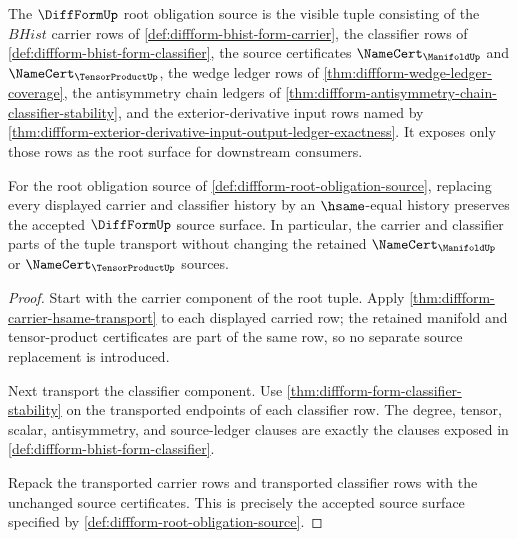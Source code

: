 \begin{definition}
\label{def:diffform-root-obligation-source}
The $\DiffFormUp$ root obligation source is the visible tuple consisting of
the $BHist$ carrier rows of
\autoref{def:diffform-bhist-form-carrier}, the classifier rows of
\autoref{def:diffform-bhist-form-classifier}, the source certificates
$\NameCert_{\ManifoldUp}$ and $\NameCert_{\TensorProductUp}$, the wedge
ledger rows of \autoref{thm:diffform-wedge-ledger-coverage}, the
antisymmetry chain ledgers of
\autoref{thm:diffform-antisymmetry-chain-classifier-stability}, and the
exterior-derivative input rows named by
\autoref{thm:diffform-exterior-derivative-input-output-ledger-exactness}.
It exposes only those rows as the root surface for downstream consumers.
\end{definition}

\begin{theorem}
\label{thm:diffform-root-source-transport-obligation}
For the root obligation source of
\autoref{def:diffform-root-obligation-source}, replacing every displayed
carrier and classifier history by an $\hsame$-equal history preserves the
accepted $\DiffFormUp$ source surface. In particular, the carrier and
classifier parts of the tuple transport without changing the retained
$\NameCert_{\ManifoldUp}$ or $\NameCert_{\TensorProductUp}$ sources.
\end{theorem}
\begin{proof}
Start with the carrier component of the root tuple. Apply
\autoref{thm:diffform-carrier-hsame-transport} to each displayed carried row;
the retained manifold and tensor-product certificates are part of the same
row, so no separate source replacement is introduced.

Next transport the classifier component. Use
\autoref{thm:diffform-form-classifier-stability} on the transported endpoints
of each classifier row. The degree, tensor, scalar, antisymmetry, and
source-ledger clauses are exactly the clauses exposed in
\autoref{def:diffform-bhist-form-classifier}.

Repack the transported carrier rows and transported classifier rows with the
unchanged source certificates. This is precisely the accepted source surface
specified by \autoref{def:diffform-root-obligation-source}.
\end{proof}

